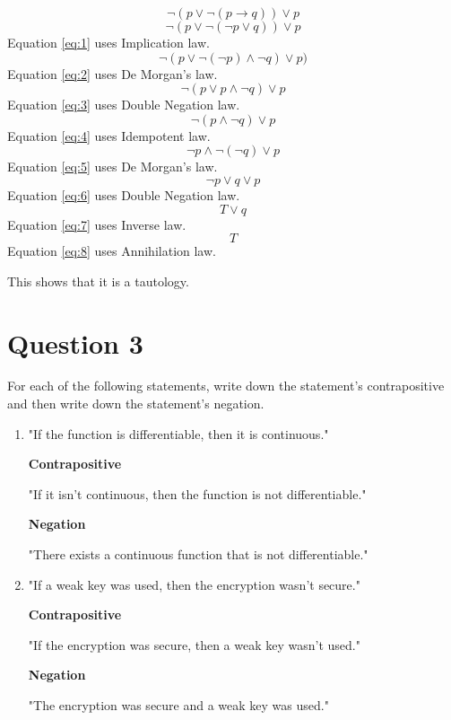 \documentclass[11pt]{article}
\begin{document}
\begin{equation}
	\neg (p \lor \neg (p \to q)) \lor p
\end{equation}
\begin{equation} \label{eq:1}
	\neg (p \lor \neg (\neg p \lor q)) \lor p
\end{equation}
Equation \ref{eq:1} uses Implication law.
\begin{equation} \label{eq:2}
	\neg (p \lor \neg (\neg p) \land \neg q) \lor p)
\end{equation}
Equation \ref{eq:2} uses De Morgan's law.
\begin{equation} \label{eq:3}
	\neg (p \lor p \land \neg q) \lor p	
\end{equation}
Equation \ref{eq:3} uses Double Negation law.
\begin{equation} \label{eq:4}
	\neg (p \land \neg q) \lor p
\end{equation}
Equation \ref{eq:4} uses Idempotent law.
\begin{equation} \label{eq:5}
	\neg p \land \neg (\neg q) \lor p
\end{equation}
Equation \ref{eq:5} uses De Morgan's law.
\begin{equation} \label{eq:6}
	\neg  p \lor q \lor p
\end{equation}
Equation \ref{eq:6} uses Double Negation law.
\begin{equation} \label{eq:7}
	T \lor q
\end{equation}
Equation \ref{eq:7} uses Inverse law.
\begin{equation} \label{eq:8}
	T
\end{equation}
Equation \ref{eq:8} uses Annihilation law.

This shows that it is a tautology.

\break

\section*{Question 3}
For each of the following statements, write down the statement's contrapositive and then write down the statement's negation.

\begin{enumerate}[label=(\roman*)]
\item "If the function is differentiable, then it is continuous."

	\textbf{Contrapositive}
	
	"If it isn't continuous, then the function is not differentiable."
	
	\textbf{Negation}
	
	"There exists a continuous function that is not differentiable."

\item "If a weak key was used, then the encryption wasn't secure."

	\textbf{Contrapositive}
	
	"If the encryption was secure, then a weak key wasn't used."
	
	\textbf{Negation}
	
	"The encryption was secure and a weak key was used."
	
\end{enumerate}
\break
\end{document}
